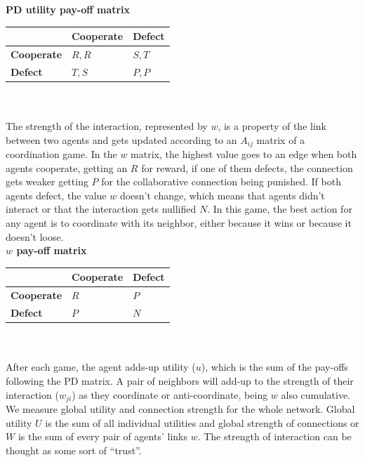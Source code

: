 \documentclass[11pt]{article}
\begin{document}
{\bf PD utility pay-off matrix}\\

\begin{tabular}{| l | l | l |}
\hline
          & \bf{Cooperate} & \bf{Defect} \\ \hline
\bf{Cooperate} &  $R,R$      &  $S,T$   \\ \hline
\bf{Defect}    &  $T,S$      &  $P,P$   \\ \hline

\end{tabular}\\ \\

The strength of the interaction, represented by $w$, is a property of the link between two agents and
gets updated according to an $A_{ij}$ matrix of a coordination game. In the $w$ matrix, the highest value
goes to an edge when both agents cooperate, getting an $R$ for reward, if one of
them defects, the connection gets weaker getting $P$ for the collaborative
connection being punished. If both agents defect, the value $w$ doesn't change,
which means that agents didn't interact or that the interaction gets nullified
$N$. In this game, the best action for any agent is to coordinate with its
neighbor, either because it wins or because it doesn't loose. \\ 

{\bf $w$ pay-off matrix}\\

\begin{tabular}{| l | l | l |}
\hline
          & \bf{Cooperate} & \bf{Defect} \\ \hline
\bf{Cooperate} &  $R$      &  $P$   \\ \hline
\bf{Defect}    &  $P$      &  $N$   \\ \hline

\end{tabular}\\ \\


After each game, the agent adds-up utility ($u$), which is the sum of the
pay-offs following the PD matrix. A pair of neighbors will add-up to the strength of
their interaction ($w_{ji}$) as they coordinate or anti-coordinate, being $w$
also cumulative. We measure global utility and connection strength for the whole
network. Global utility $U$ is the sum of all individual utilities and global
strength of connections or $W$ is the sum of every pair of agents' links
$w$. The strength of interaction can 
be thought as some sort of ``trust''.\\
\end{document}
